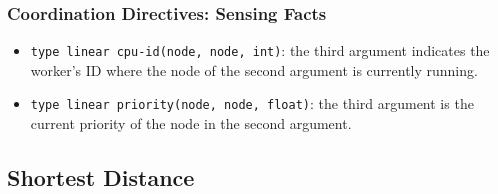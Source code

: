 \documentclass{beamer}
\begin{document}
\begin{frame}[fragile]
   \frametitle{Coordination Directives: Sensing Facts}
   \begin{itemize}
      \item \texttt{type linear cpu-id(node, node, int)}: the third argument indicates the worker's ID where the node of the second argument is currently running.
      \item \texttt{type linear priority(node, node, float)}: the third argument is the current priority of the node in the second argument.
   \end{itemize}
\end{frame}

\subsection{Shortest Distance}
\end{document}
